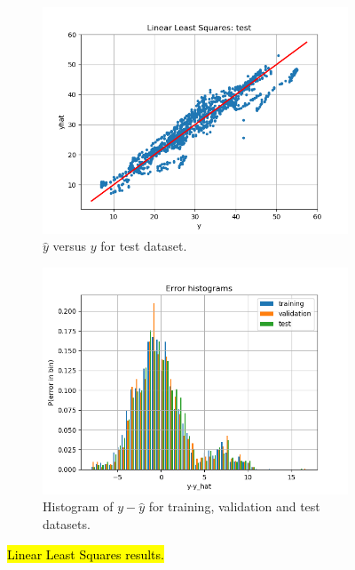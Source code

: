 \documentclass[12pt]{article}
\begin{document}
\begin{figure}
\centering
\begin{subfigure}{0.45\textwidth}
\includegraphics[width=\textwidth]{regression.png}  
\caption{$\hat{y}$ versus $y$ for test dataset.}
\label{fig:LLS_regr}
\end{subfigure}
\begin{subfigure}{0.45\textwidth}
\includegraphics[width=\textwidth]{hist_err.png}    
\caption{Histogram of $y-\hat{y}$ for training, validation and test datasets.}
\label{fig:LLS_hist}
\end{subfigure}
\caption{\hl{Linear Least Squares results.}}
\label{fig:LLS}
\end{figure}
\end{document}
